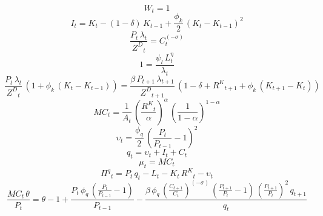\noindent[name= `BC']
\begin{dmath}
{W}_{t}=1
\end{dmath}
\noindent[name= `Investment']
\begin{dmath}
{I}_{t}={K}_{t}-\left(1-{\delta}\right)\, {K}_{t-1}+\frac{{\phi_k}}{2}\, \left({K}_{t}-{K}_{t-1}\right)^{2}
\end{dmath}
\noindent[name= `Lambda']
\begin{dmath}
\frac{{P}_{t}\, {\lambda}_{t}}{{Z^D}_{t}}={C}_{t}^{\left(-{\sigma}\right)}
\end{dmath}
\noindent[name= `Labor Supply']
\begin{dmath}
1=\frac{{\psi_l}\, {L}_{t}^{{\eta}}}{{\lambda}_{t}}
\end{dmath}
\noindent[name= `Euler Equation K']
\begin{dmath}
\frac{{P}_{t}\, {\lambda}_{t}}{{Z^D}_{t}}\, \left(1+{\phi_k}\, \left({K}_{t}-{K}_{t-1}\right)\right)=\frac{{\beta}\, {P}_{t+1}\, {\lambda}_{t+1}}{{Z^D}_{t+1}}\, \left(1-{\delta}+{R^K}_{t+1}+{\phi_k}\, \left({K}_{t+1}-{K}_{t}\right)\right)
\end{dmath}
\noindent[name= `MC']
\begin{dmath}
{MC}_{t}=\frac{1}{{A}_{t}}\, \left(\frac{{R^K}_{t}}{{\alpha}}\right)^{{\alpha}}\, \left(\frac{1}{1-{\alpha}}\right)^{1-{\alpha}}
\end{dmath}
\noindent[name= `Price adjustment cost']
\begin{dmath}
{\upsilon}_{t}=\frac{{\phi_q}}{2}\, \left(\frac{{P}_{t}}{{P}_{t-1}}-1\right)^{2}
\end{dmath}
\noindent[name= `Market clearing for final goods']
\begin{dmath}
{q}_{t}={\upsilon}_{t}+{I}_{t}+{C}_{t}
\end{dmath}
\noindent[name= `mu']
\begin{dmath}
{\mu}_{t}={MC}_{t}
\end{dmath}
\noindent[name= `Profits']
\begin{dmath}
{\Pi^q}_{t}={P}_{t}\, {q}_{t}-{L}_{t}-{K}_{t}\, {R^K}_{t}-{\upsilon}_{t}
\end{dmath}
\noindent[name= `Optimal prices: Phillips Curve']
\begin{dmath}
\frac{{MC}_{t}\, {\theta}}{{P}_{t}}={\theta}-1+\frac{{P}_{t}\, {\phi_q}\, \left(\frac{{P}_{t}}{{P}_{t-1}}-1\right)}{{P}_{t-1}}-\frac{{\beta}\, {\phi_q}\, \left(\frac{{C}_{t+1}}{{C}_{t}}\right)^{\left(-{\sigma}\right)}\, \left(\frac{{P}_{t+1}}{{P}_{t}}-1\right)\, \left(\frac{{P}_{t+1}}{{P}_{t}}\right)^{2}\, {q}_{t+1}}{{q}_{t}}
\end{dmath}
